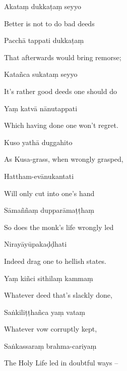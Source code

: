 Akataṃ dukkaṭaṃ seyyo

\begin{english}
  Better is not to do bad deeds
\end{english}

Pacchā tappati dukkaṭaṃ

\begin{english}
  That afterwards would bring remorse;
\end{english}

Katañca sukataṃ seyyo

\begin{english}
  It's rather good deeds one should do
\end{english}

Yaṃ katvā nānutappati

\begin{english}
  Which having done one won't regret.
\end{english}

Kuso yathā duggahito

\begin{english}
  As Kusa-grass, when wrongly grasped,
\end{english}

Hattham-evānukantati

\begin{english}
  Will only cut into one's hand
\end{english}

Sāmaññaṃ dupparāmaṭṭhaṃ

\begin{english}
  So does the monk's life wrongly led
\end{english}

Nirayāyūpakaḍḍhati

\begin{english}
  Indeed drag one to hellish states.
\end{english}

Yaṃ kiñci sithilaṃ kammaṃ

\begin{english}
  Whatever deed that's slackly done,
\end{english}

Saṅkiliṭṭhañca yaṃ vataṃ

\begin{english}
  Whatever vow corruptly kept,
\end{english}

Saṅkassaraṃ brahma-cariyaṃ

\begin{english}
  The Holy Life led in doubtful ways --
\end{english}

